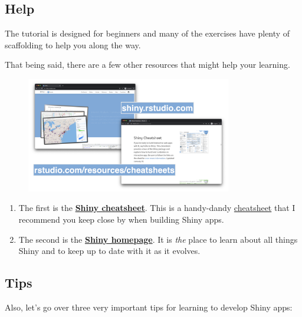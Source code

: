 \documentclass[
  letterpaper,
  DIV=11,
  numbers=noendperiod]{scrreprt}
\begin{document}
\hypertarget{help}{%
\subsection{Help}\label{help}}

The tutorial is designed for beginners and many of the exercises have
plenty of scaffolding to help you along the way.

That being said, there are a few other resources that might help your
learning.

\begin{figure}

{\centering \includegraphics[width=0.8\textwidth,height=\textheight]{./images/help.png}

}

\end{figure}

\begin{enumerate}
\def\labelenumi{\arabic{enumi}.}
\item
  The first is the
  \href{https://github.com/rstudio/cheatsheets/raw/master/shiny.pdf}{\textbf{Shiny
  cheatsheet}}. This is a handy-dandy
  \href{https://rstudio.com/resources/cheatsheets/}{cheatsheet} that I
  recommend you keep close by when building Shiny apps.
\item
  The second is the \href{https://shiny.rstudio.com}{\textbf{Shiny
  homepage}}. It is \emph{the} place to learn about all things Shiny and
  to keep up to date with it as it evolves.
\end{enumerate}

\hypertarget{tips}{%
\subsection{Tips}\label{tips}}

Also, let's go over three very important tips for learning to develop
Shiny apps:
\end{document}
